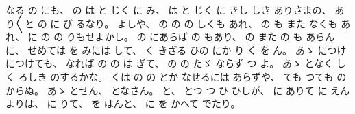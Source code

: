 なる
の
にも、
%
の
は
と
じく
に
み、
%
は
と
じく
%
に
きし
しき
ありさまの、
%
あり〳〵と
の
に%
び
るなり。
%
よしや、
%
の
の
の
しくも
あれ、
%
の
も
また
なくも
あれ、
%
に
の
の
りもせよかし。
%
の
にあらば
の
もあり、
%
の
また
の
も
あらんに、
%
せめては
を
%
みには
して、
%
く
きざる
ひの
にか
り
く
を
ん。
%
あゝ%
につけ
につけても、
%
なれば
の
の
は
ぎて、
%
の
の
たゞ%
ならず
つ
よ。
%
あゝ%
となく
しく
ろしき
のするかな。
%
くは
の
の
とか
なせるには
あらずや、
%
ても
つても
の%
からぬ。
%
あゝ%
とせん、
%
となさん。
%
と、
%
とつ
つ
ひ
ひしが、
%
に%
ありて
に
えん
よりは、
%
に
りて、
%
を
はんと、%
%
に
を
かへて
でたり。

